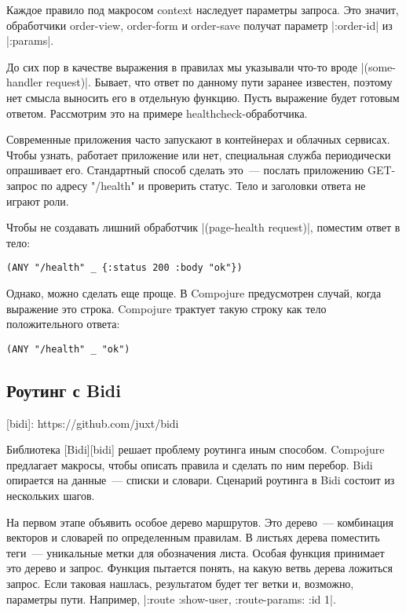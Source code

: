 Каждое правило под макросом context наследует параметры запроса. Это значит,
обработчики order-view, order-form и order-save получат параметр \spverb|:order-id| из
\spverb|:params|.

До сих пор в качестве выражения в правилах мы указывали что-то вроде
\spverb|(some-handler request)|. Бывает, что ответ по данному пути заранее известен,
поэтому нет смысла выносить его в отдельную функцию. Пусть выражение будет
готовым ответом. Рассмотрим это на примере healthcheck-обработчика.

Современные приложения часто запускают в контейнерах и облачных сервисах.  Чтобы
узнать, работает приложение или нет, специальная служба периодически опрашивает
его. Стандартный способ сделать это~--- послать приложению GET-запрос по адресу
"/health" и проверить статус. Тело и заголовки ответа не играют роли.

Чтобы не создавать лишний обработчик \spverb|(page-health request)|, поместим ответ в
тело:

\begin{verbatim}
(ANY "/health" _ {:status 200 :body "ok"})
\end{verbatim}

Однако, можно сделать еще проще. В Compojure предусмотрен случай, когда
выражение это строка. Compojure трактует такую строку как тело положительного
ответа:

\begin{verbatim}
(ANY "/health" _ "ok")
\end{verbatim}

\subsection{Роутинг с Bidi}

[bidi]: https://github.com/juxt/bidi

Библиотека [Bidi][bidi] решает проблему роутинга иным способом. Compojure
предлагает макросы, чтобы описать правила и сделать по ним перебор. Bidi
опирается на данные~--- списки и словари. Сценарий роутинга в Bidi состоит из
нескольких шагов.

На первом этапе объявить особое дерево маршрутов. Это дерево~--- комбинация
векторов и словарей по определенным правилам. В листьях дерева поместить теги~---
уникальные метки для обозначения листа. Особая функция принимает это дерево и
запрос. Функция пытается понять, на какую ветвь дерева ложиться запрос. Если
таковая нашлась, результатом будет тег ветки и, возможно, параметры
пути. Например, \spverb|{:route :show-user, :route-params: {:id 1}}|.

